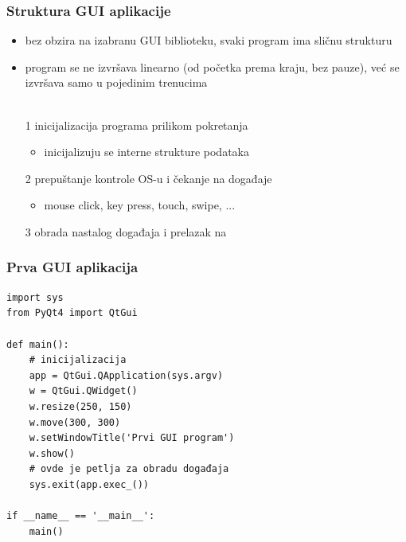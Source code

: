 \documentclass[utf8,compress]{beamer}
\begin{document}
\begin{frame}[fragile]
  \frametitle{Struktura GUI aplikacije}
  \begin{itemize}
    \item bez obzira na izabranu GUI biblioteku, svaki program ima sličnu strukturu
    \item program se ne izvršava linearno (od početka prema kraju, bez pauze), već se izvršava samo u pojedinim trenucima \\ \ \\
    \item[1] inicijalizacija programa prilikom pokretanja 
    \begin{itemize}
      \item inicijalizuju se interne strukture podataka
    \end{itemize}
    \item[2] prepuštanje kontrole OS-u i čekanje na događaje
    \begin{itemize}
      \item mouse click, key press, touch, swipe, ...
    \end{itemize}
    \item[3] obrada nastalog događaja i prelazak na 
  \end{itemize}
\end{frame}

\begin{frame}[fragile]
  \frametitle{Prva GUI aplikacija}
\begin{verbatim}
import sys
from PyQt4 import QtGui

def main():
    # inicijalizacija
    app = QtGui.QApplication(sys.argv)
    w = QtGui.QWidget()
    w.resize(250, 150)
    w.move(300, 300)
    w.setWindowTitle('Prvi GUI program')
    w.show()
    # ovde je petlja za obradu događaja
    sys.exit(app.exec_())

if __name__ == '__main__':
    main()
\end{verbatim}
\end{frame}
\end{document}
